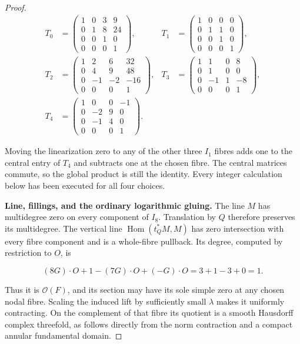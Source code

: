 \begin{proof}
\[
\begin{aligned}
 T_0&=\begin{pmatrix}1&0&3&9\\0&1&8&24\\0&0&1&0\\0&0&0&1\end{pmatrix},
 &T_1&=\begin{pmatrix}1&0&0&0\\0&1&1&0\\0&0&1&0\\0&0&0&1\end{pmatrix},\\
 T_2&=\begin{pmatrix}1&2&6&32\\0&4&9&48\\0&-1&-2&-16\\0&0&0&1\end{pmatrix},
 &T_3&=\begin{pmatrix}1&1&0&8\\0&1&0&0\\0&-1&1&-8\\0&0&0&1\end{pmatrix},\\
 T_4&=\begin{pmatrix}1&0&0&-1\\0&-2&9&0\\0&-1&4&0\\0&0&0&1\end{pmatrix}.
\end{aligned}
\]

Moving the linearization zero to any of the other three \(I_1\)
fibres adds one to the central entry of \(T_4\) and subtracts
one at the chosen fibre.  The central matrices commute, so the
global product is still the identity.  Every integer calculation
below has been executed for all four choices.

\par\medskip\noindent\textbf{Line, fillings, and the ordinary logarithmic gluing.}\enspace
The line \(M\) has multidegree zero on every component of
\(I_8\).  Translation by \(Q\) therefore preserves its
multidegree.  The vertical line
\(\operatorname{Hom}(t_Q^*M,M)\) has zero intersection with
every fibre component and is a whole-fibre pullback.  Its degree,
computed by restriction to \(O\), is

\[
 (8G)\cdot O+1-(7G)\cdot O+(-G)\cdot O
 =3+1-3+0=1.
\]

Thus it is \(\mathcal O(F)\), and its section may have its
sole simple zero at any chosen nodal fibre.  Scaling the induced
lift by sufficiently small \(\lambda\) makes it uniformly
contracting.  On the complement of that fibre its quotient is a
smooth Hausdorff complex threefold, as follows directly from the
norm contraction and a compact annular fundamental domain.


\end{proof}
